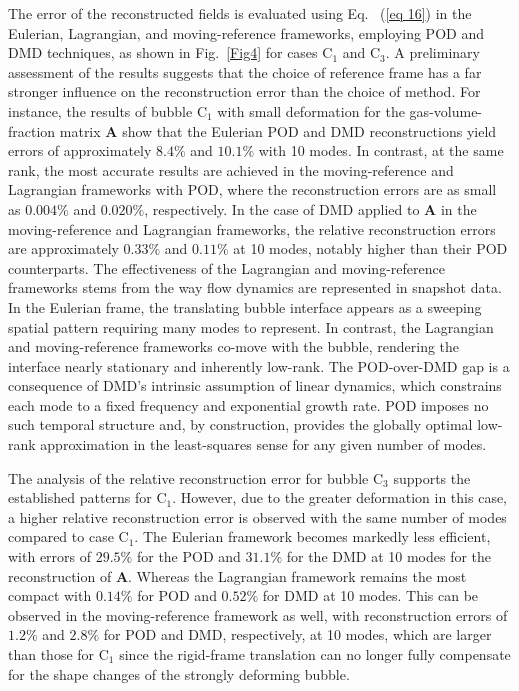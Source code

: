 \documentclass[a4paper,fleqn]{cas-sc}
\begin{document}
	The error of the reconstructed fields is evaluated using Eq. ~(\ref{eq 16}) in the Eulerian, Lagrangian, and moving-reference frameworks, employing POD and DMD techniques, as shown in Fig.~\ref {Fig4} for cases C$_1$ and C$_3$. A preliminary assessment of the results suggests that the choice of reference frame has a far stronger influence on the reconstruction error than the choice of method. For instance, the results of bubble C$_1$ with small deformation for the gas-volume-fraction matrix $\mathbf{A}$ show that the Eulerian POD and DMD reconstructions yield errors of approximately $8.4\%$ and $10.1\%$ with 10 modes. In contrast, at the same rank, the most accurate results are achieved in the moving-reference and Lagrangian frameworks with POD, where the reconstruction errors are as small as $0.004\%$ and $0.020\%$, respectively. In the case of DMD applied to $\mathbf{A}$ in the moving-reference and Lagrangian frameworks, the relative reconstruction errors are approximately $0.33\%$ and $0.11\%$ at 10 modes, notably higher than their POD counterparts. The effectiveness of the Lagrangian and moving-reference frameworks stems from the way flow dynamics are represented in snapshot data. In the Eulerian frame, the translating bubble interface appears as a sweeping spatial pattern requiring many modes to represent. In contrast, the Lagrangian and moving-reference frameworks co-move with the bubble, rendering the interface nearly stationary and inherently low-rank. The POD-over-DMD gap is a consequence of DMD's intrinsic assumption of linear dynamics, which constrains each mode to a fixed frequency and exponential growth rate. POD imposes no such temporal structure and, by construction, provides the globally optimal low-rank approximation in the least-squares sense for any given number of modes.
	
	The analysis of the relative reconstruction error for bubble C$_3$ supports the established patterns for C$_1$. However, due to the greater deformation in this case, a higher relative reconstruction error is observed with the same number of modes compared to case C$_1$. The Eulerian framework becomes markedly less efficient, with errors of $29.5\%$ for the POD and $31.1\%$ for the DMD at 10 modes for the reconstruction of $\mathbf{A}$. Whereas the Lagrangian framework remains the most compact with $0.14\%$ for POD and $0.52\%$ for DMD at 10 modes. This can be observed in the moving-reference framework as well, with reconstruction errors of $1.2\%$ and $2.8\%$ for POD and DMD, respectively, at 10 modes, which are larger than those for C$_1$ since the rigid-frame translation can no longer fully compensate for the shape changes of the strongly deforming bubble.
	
\end{document}

